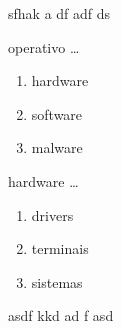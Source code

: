 %
sfhak 
 a
 df adf ds
\begin{diapo} \begin{frame}{ operativo   \dots} 
\begin{enumerate}
	\item hardware\pause
	\item software \pause
	\item malware 
\end{enumerate} \end{frame}  \end{diapo}  
\begin{diapo}\begin{frame}{ hardware   \dots}
\begin{enumerate}
	\item drivers \pause
	\item terminais \pause
	\item sistemas 
\end{enumerate} \end{frame} \end{diapo}
asdf kkd ad
f asd
%





%
%
